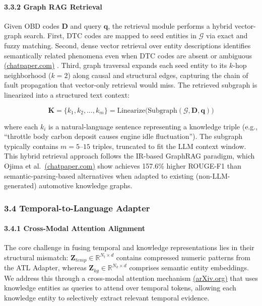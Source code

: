 \documentclass[
  11pt,
]{article}
\begin{document}
\paragraph{3.3.2 Graph RAG Retrieval}\label{graph-rag-retrieval}

Given OBD codes \(\mathbf{D}\) and query \(\mathbf{q}\), the retrieval
module performs a hybrid vector-graph search. First, DTC codes are
mapped to seed entities in \(\mathcal{G}\) via exact and fuzzy matching.
Second, dense vector retrieval over entity descriptions identifies
semantically related phenomena even when DTC codes are absent or
ambiguous
\href{https://chatpaper.com/chatpaper/paper/140970}{(chatpaper.com)} .
Third, graph traversal expands each seed entity to its \(k\)-hop
neighborhood (\(k=2\)) along causal and structural edges, capturing the
chain of fault propagation that vector-only retrieval would miss. The
retrieved subgraph is linearized into a structured text context:

\[ \mathbf{K} = \{k_1, k_2, \ldots, k_m\} = \text{Linearize}\bigl(\text{Subgraph}(\mathcal{G}, \mathbf{D}, \mathbf{q})\bigr) \tag{3} \]

where each \(k_i\) is a natural-language sentence representing a
knowledge triple (e.g., ``throttle body carbon deposit causes engine
idle fluctuation''). The subgraph typically contains \(m = 5\)--\(15\)
triples, truncated to fit the LLM context window. This hybrid retrieval
approach follows the IR-based GraphRAG paradigm, which Ojima et
al.~\href{https://chatpaper.com/chatpaper/paper/140970}{(chatpaper.com)}
show achieves 157.6\% higher ROUGE-F1 than semantic-parsing-based
alternatives when adapted to existing (non-LLM-generated) automotive
knowledge graphs.

\subsubsection{3.4 Temporal-to-Language
Adapter}\label{temporal-to-language-adapter}

\paragraph{3.4.1 Cross-Modal Attention
Alignment}\label{cross-modal-attention-alignment}

The core challenge in fusing temporal and knowledge representations lies
in their structural mismatch:
\(\mathbf{Z}_{temp} \in \mathbb{R}^{N_t \times d}\) contains compressed
numeric patterns from the ATL Adapter, whereas
\(\mathbf{Z}_{kg} \in \mathbb{R}^{N_k \times d}\) comprises semantic
entity embeddings. We address this through a cross-modal attention
mechanism \href{https://arxiv.org/pdf/2510.07567}{(arXiv.org)} that uses
knowledge entities as queries to attend over temporal tokens, allowing
each knowledge entity to selectively extract relevant temporal evidence.
\end{document}
